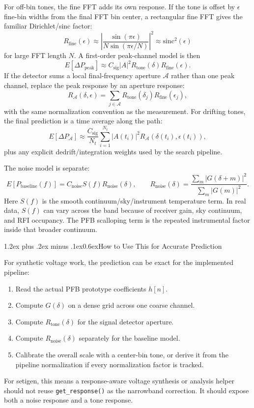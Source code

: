 \documentclass[10pt]{article}
\makeatletter
\renewcommand\section{\@startsection{section}{1}{0pt}%
  {1.2ex plus .2ex minus .1ex}{0.6ex}{\normalsize\bfseries}}
\makeatother
\begin{document}
For off-bin tones, the fine FFT adds its own response.  If the tone is offset by
$\epsilon$ fine-bin widths from the final FFT bin center, a rectangular fine FFT
gives the familiar Dirichlet/sinc factor:
\[
    R_{\mathrm{fine}}(\epsilon)
    \approx \left|\frac{\sin(\pi \epsilon)}
                       {N \sin(\pi \epsilon/N)}\right|^2
    \approx \mathrm{sinc}^2(\epsilon)
\]
for large FFT length $N$.  A first-order peak-channel model is then
\[
    E[\Delta P_{\mathrm{peak}}]
    \approx
    C_{\mathrm{sig}} |A|^2
    R_{\mathrm{tone}}(\delta)
    R_{\mathrm{fine}}(\epsilon).
\]
If the detector sums a local final-frequency aperture $\mathcal{A}$ rather than
one peak channel, replace the peak response by an aperture response:
\[
    R_{\mathcal{A}}(\delta,\epsilon)
    =
    \sum_{j\in\mathcal{A}}
    R_{\mathrm{tone}}(\delta_j) R_{\mathrm{fine}}(\epsilon_j),
\]
with the same normalization convention as the measurement.  For drifting tones,
the final prediction is a time average along the path:
\[
    E[\Delta P_{\mathcal{A}}]
    \approx
    \frac{C_{\mathrm{sig}}}{N_t}
    \sum_{i=1}^{N_t} |A(t_i)|^2
    R_{\mathcal{A}}\!\left(\delta(t_i), \epsilon(t_i)\right),
\]
plus any explicit dedrift/integration weights used by the search pipeline.

The noise model is separate:
\[
    E[P_{\mathrm{baseline}}(f)]
    =
    C_{\mathrm{noise}} S(f)
    R_{\mathrm{noise}}(\delta),
    \qquad
    R_{\mathrm{noise}}(\delta)
    =
    \frac{\sum_m |G(\delta+m)|^2}
         {\sum_m |G(m)|^2}.
\]
Here $S(f)$ is the smooth continuum/sky/instrument temperature term.  In real
data, $S(f)$ can vary across the band because of receiver gain, sky continuum,
and RFI occupancy.  The PFB scalloping term is the repeated instrumental factor
inside that broader continuum.

\section{How to Use This for Accurate Prediction}

For synthetic voltage work, the prediction can be exact for the implemented
pipeline:
\begin{enumerate}
    \item Read the actual PFB prototype coefficients $h[n]$.
    \item Compute $G(\delta)$ on a dense grid across one coarse channel.
    \item Compute $R_{\mathrm{tone}}(\delta)$ for the signal detector aperture.
    \item Compute $R_{\mathrm{noise}}(\delta)$ separately for the baseline model.
    \item Calibrate the overall scale with a center-bin tone, or derive it from
    the pipeline normalization if every normalization factor is tracked.
\end{enumerate}
For setigen, this means a response-aware voltage synthesis or analysis helper
should not reuse \texttt{get\_response()} as the narrowband correction.  It
should expose both a noise response and a tone response.
\end{document}
